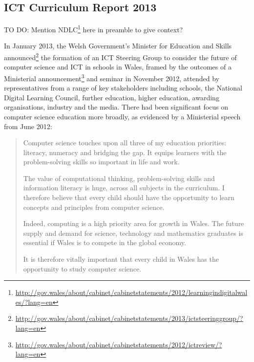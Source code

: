 \documentclass{sig-alternate}
\begin{document}
%

\subsection{ICT Curriculum Report 2013}


TO DO: Mention
NDLC\footnote{\url{http://gov.wales/about/cabinet/cabinetstatements/2012/learningindigitalwales/?lang=en}}
here in preamble to give context?

In January 2013, the Welsh Government's Minister for Education and
Skills
announced\footnote{\url{http://gov.wales/about/cabinet/cabinetstatements/2013/ictsteeringgroup/?lang=en}}
the formation of an ICT Steering Group to consider the future of
computer science and ICT in schools in Wales, framed by the outcomes
of a Ministerial
announcement\footnote{\url{http://gov.wales/about/cabinet/cabinetstatements/2012/ictreview/?lang=en}}
and seminar in November 2012, attended by representatives from a range
of key stakeholders including schools, the National Digital Learning
Council, further education, higher education, awarding organisations,
industry and the media. There had been significant focus on computer
science education more broadly, as evidenced by a Ministerial speech
from June 2012:

\begin{quotation}
Computer science touches upon all three of my education priorities:
literacy, numeracy and bridging the gap. It equips learners with the
problem-solving skills so important in life and work.

The value of computational thinking, problem-solving skills and
information literacy is huge, across all subjects in the curriculum. I
therefore believe that every child should have the opportunity to
learn concepts and principles from computer science.

Indeed, computing is a high priority area for growth in Wales. The
future supply and demand for science, technology and mathematics
graduates is essential if Wales is to compete in the global economy.

It is therefore vitally important that every child in Wales has the
opportunity to study computer science.
\end{quotation}
\end{document}
